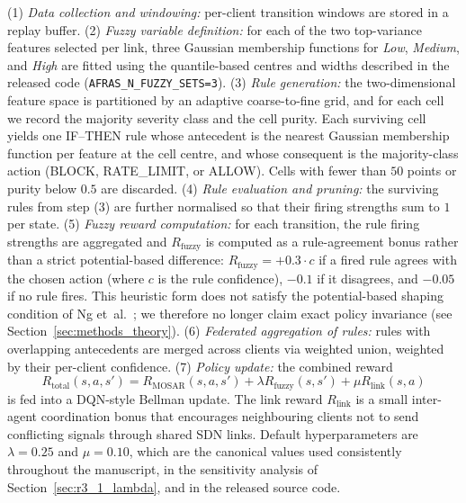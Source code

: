\documentclass[ai,article,submit,moreauthors,pdftex]{Definitions/mdpi}
\newcommand{\rev}[1]{#1}
\begin{document}
(1) \emph{Data collection and
windowing:} per-client transition windows are stored in a replay buffer.
(2) \emph{Fuzzy variable definition:} \rev{for each of the two top-variance features selected per link, three Gaussian membership functions for \emph{Low}, \emph{Medium}, and \emph{High} are fitted using the quantile-based centres and widths described in the released code (\texttt{AFRAS\_N\_FUZZY\_SETS=3})}. (3) \emph{Rule
generation:} \rev{the two-dimensional feature space is partitioned by an adaptive coarse-to-fine grid, and for each cell we record the majority severity class and the cell purity. Each surviving cell yields one IF--THEN rule whose antecedent is the nearest Gaussian membership function per feature at the cell centre, and whose consequent is the majority-class action (BLOCK, RATE\_LIMIT, or ALLOW). Cells with fewer than $50$ points or purity below $0.5$ are discarded.} (4) \emph{Rule evaluation and
pruning:} \rev{the surviving rules from step (3) are further normalised so that their firing strengths sum to $1$ per state.}
(5) \emph{Fuzzy reward computation:} \rev{for each transition, the rule firing strengths are aggregated and $R_{\text{fuzzy}}$ is computed as a rule-agreement bonus rather than a strict potential-based difference: $R_{\text{fuzzy}} = +0.3\cdot c$ if a fired rule agrees with the chosen action (where $c$ is the rule confidence), $-0.1$ if it disagrees, and $-0.05$ if no rule fires. This heuristic form does not satisfy the potential-based shaping condition of Ng et~al.~\cite{ng1999policy_invariance}; we therefore no longer claim exact policy invariance (see Section~\ref{sec:methods_theory}).}
(6) \emph{Federated aggregation of rules:} rules with overlapping
antecedents are merged across clients via weighted union, weighted by
their per-client confidence. (7) \emph{Policy update:} the combined
reward
\begin{equation}\label{eq:total}
R_{\text{total}}(s,a,s') = R_{\text{MOSAR}}(s,a,s')
 + \lambda R_{\text{fuzzy}}(s,s')
 + \mu R_{\text{link}}(s,a)
\end{equation}
is fed into a DQN-style Bellman update. The link reward $R_{\text{link}}$
is a small inter-agent coordination bonus that encourages neighbouring
clients not to send conflicting signals through shared SDN links.
\rev{Default hyperparameters are $\lambda = 0.25$ and $\mu = 0.10$, which are the canonical values used consistently throughout the manuscript, in the sensitivity analysis of Section~\ref{sec:r3_1_lambda}, and in the released source code.}
\end{document}
